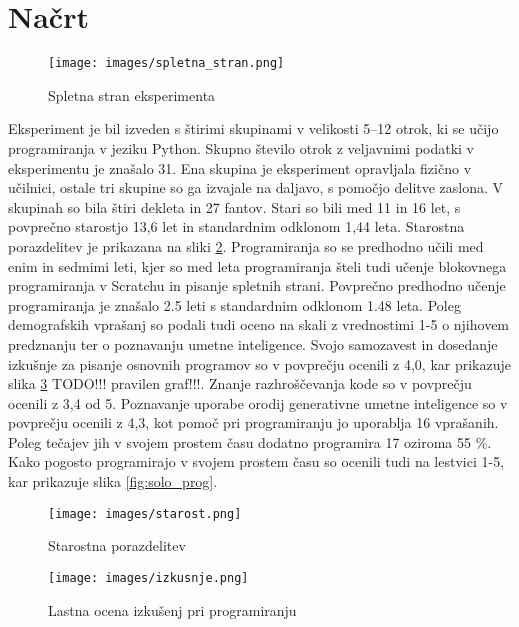 \documentclass[a4paper,12pt,openright]{book}
\begin{document}
\section{Načrt}

\begin{figure}[H]
    \centering
    \texttt{[image: images/spletna\_stran.png]}
    \caption{Spletna stran eksperimenta}
    \label{fig:enter-label}
\end{figure}

Eksperiment je bil izveden s štirimi skupinami v velikosti 5–12 otrok, ki se učijo programiranja v jeziku Python. Skupno število otrok z veljavnimi podatki v eksperimentu je znašalo 31. Ena skupina je eksperiment opravljala fizično v učilnici, ostale tri skupine so ga izvajale na daljavo, s pomočjo delitve zaslona. V skupinah so bila štiri dekleta in 27 fantov. Stari so bili med 11 in 16 let, s povprečno starostjo 13,6 let in standardnim odklonom 1,44 leta. Starostna porazdelitev je prikazana na sliki \ref{fig:ages}.  Programiranja so se predhodno učili med enim in sedmimi leti, kjer so med leta programiranja šteli tudi učenje blokovnega programiranja v Scratchu in pisanje spletnih strani. Povprečno predhodno učenje programiranja je znašalo 2.5 leti s standardnim odklonom 1.48 leta.
Poleg demografskih vprašanj so podali tudi oceno na skali z vrednostimi 1-5 o njihovem predznanju ter o poznavanju umetne inteligence. Svojo samozavest in dosedanje izkušnje za pisanje osnovnih programov so v povprečju ocenili z 4,0, kar prikazuje slika \ref{fig:izkusnje} TODO!!! pravilen graf!!!. Znanje razhroščevanja kode so v povprečju ocenili z 3,4 od 5. Poznavanje uporabe orodij generativne umetne inteligence so v povprečju ocenili z 4,3, kot pomoč pri programiranju jo uporablja 16 vprašanih.
Poleg tečajev jih v svojem prostem času dodatno programira 17 oziroma 55 \%. Kako pogosto programirajo v svojem prostem času so ocenili tudi na lestvici 1-5, kar prikazuje slika \ref{fig:solo_prog}.

\begin{figure}[H]
    \centering
    \texttt{[image: images/starost.png]}
    \caption{Starostna porazdelitev}
    \label{fig:ages}
\end{figure}

\begin{figure}[H]
    \centering
    \texttt{[image: images/izkusnje.png]}
    \caption{Lastna ocena izkušenj pri programiranju}
    \label{fig:izkusnje}
\end{figure}
\end{document}
